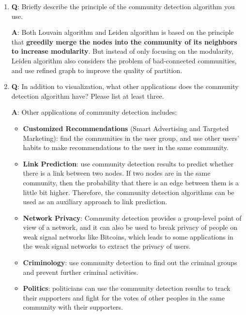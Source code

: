 \documentclass[12pt, a4paper]{article}
\theoremstyle{definition}
\begin{document}
\begin{enumerate}
\item \textbf{Q}: Briefly describe the principle of the community detection algorithm you use.
      
\textbf{A}: Both Louvain algorithm and Leiden algorithm is based on the principle that \textbf{greedily merge the nodes into the community of its neighbors to increase modularity}. But instead of only focusing on the modularity, Leiden algorithm also considers the problem of bad-connected communities, and use refined graph to improve the quality of partition.
\item \textbf{Q}: In addition to visualization, what other applications does the community detection algorithm have? Please list at least three.

\textbf{A}: Other applications of community detection includes:
\begin{itemize}
\item \textbf{Customized Recommendations} (Smart Advertising and Targeted Marketing): find the communities in the user group, and use other users' habits to make recommendations to the user in the same community.
\item \textbf{Link Prediction}: use community detection results to predict whether there is a link between two nodes. If two nodes are in the same community, then the probability that there is an edge between them is a little bit higher. Therefore, the community detection algorithms can be used as an auxiliary approach to link prediction.
\item \textbf{Network Privacy}: Community detection provides a group-level point of view of a network, and it can also be used to break privacy of people on weak signal networks like Bitcoins, which leads to some applications in the weak signal networks to extract the privacy of users.
\item \textbf{Criminology}\footnotemark[6]: use community detection to find out the criminal groups and prevent further criminal activities.
\item \textbf{Politics}\footnotemark[6]: politicians can use the community detection results to track their supporters and fight for the votes of other peoples in the same community with their supporters.
\end{itemize} 
\end{enumerate}
\end{document}
